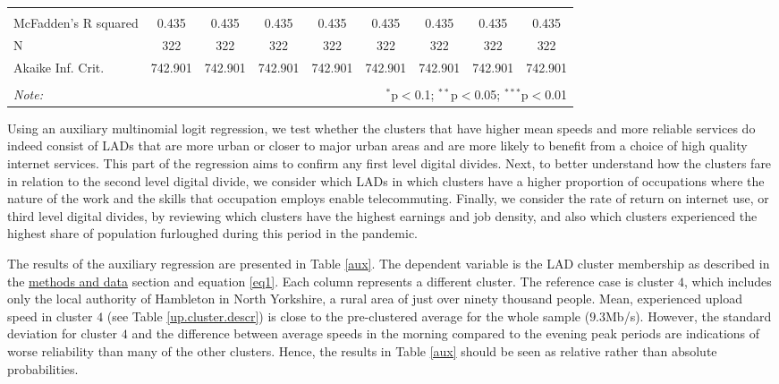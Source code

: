 \documentclass[]{interact}
\theoremstyle{plain}%
\theoremstyle{definition}
\theoremstyle{remark}
\begin{document}
\begin{table}
\begin{tabular}{@{\extracolsep{5pt}}lcccccccc}
\hline \\[-1.8ex] 
McFadden's R squared & 0.435 & 0.435 & 0.435 & 0.435 & 0.435 & 0.435 & 0.435 & 0.435 \\ 
N & 322 & 322 & 322 & 322 & 322 & 322 & 322 & 322 \\ 
Akaike Inf. Crit. & 742.901 & 742.901 & 742.901 & 742.901 & 742.901 & 742.901 & 742.901 & 742.901 \\ 
\hline 
\hline \\[-1.8ex] 
\textit{Note:}  & \multicolumn{8}{r}{$^{*}$p$<$0.1; $^{**}$p$<$0.05; $^{***}$p$<$0.01} \\ 
\end{tabular} 
\end{table}

Using an auxiliary multinomial logit regression, we test whether the
clusters that have higher mean speeds and more reliable services do
indeed consist of LADs that are more urban or closer to major urban
areas and are more likely to benefit from a choice of high quality
internet services. This part of the regression aims to confirm any first
level digital divides. Next, to better understand how the clusters fare
in relation to the second level digital divide, we consider which LADs
in which clusters have a higher proportion of occupations where the
nature of the work and the skills that occupation employs enable
telecommuting. Finally, we consider the rate of return on internet use,
or third level digital divides, by reviewing which clusters have the
highest earnings and job density, and also which clusters experienced
the highest share of population furloughed during this period in the
pandemic.

The results of the auxiliary regression are presented in Table
\ref{aux}. The dependent variable is the LAD cluster membership as
described in the \protect\hyperlink{sec:3}{methods and data} section and
equation \ref{eq1}. Each column represents a different cluster. The
reference case is cluster \(4\), which includes only the local authority
of Hambleton in North Yorkshire, a rural area of just over ninety
thousand people. Mean, experienced upload speed in cluster \(4\) (see
Table \ref{up.cluster.descr}) is close to the pre-clustered average for
the whole sample (\(9.3\)Mb/s). However, the standard deviation for
cluster \(4\) and the difference between average speeds in the morning
compared to the evening peak periods are indications of worse
reliability than many of the other clusters. Hence, the results in Table
\ref{aux} should be seen as relative rather than absolute probabilities.
\end{document}
